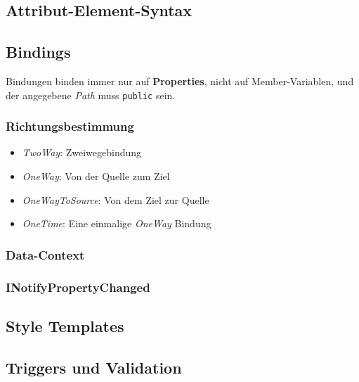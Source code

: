 \documentclass
[
	8pt,		%
	ngerman,	%
	a4paper,	%
	landscape,	%
	final		%
]{extarticle}
\begin{document}
\begin{multicols*}{3}
	\subsection{Attribut-Element-Syntax}
	
	
	\subsection{Bindings}
	Bindungen binden immer nur auf \textbf{Properties}, nicht auf
	Member-Variablen, und der angegebene \textit{Path} muss \texttt{public} sein.
	\subsubsection{Richtungsbestimmung}
	\begin{itemize}
		\item \textit{TwoWay}: Zweiwegebindung
		\item \textit{OneWay}: Von der Quelle zum Ziel
		\item \textit{OneWayToSource}: Von dem Ziel zur Quelle
		\item \textit{OneTime}: Eine einmalige \textit{OneWay} Bindung
	\end{itemize}
	\subsubsection{Data-Context}
	
	
	\columnbreak
	\subsubsection{INotifyPropertyChanged}
	
	\subsection{Style Templates}
	
	\subsection{Triggers und Validation}
	
	
\end{multicols*}
\end{document}
